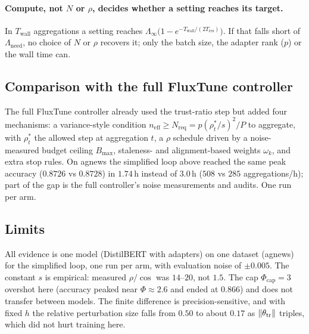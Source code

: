 \paragraph{Compute, not $N$ or $\rho$, decides whether a setting reaches its target.}
In $T_{\mathrm{wall}}$ aggregations a setting reaches $\Lambda_\infty\bigl(1-e^{-T_{\mathrm{wall}}/(2T_{\mathrm{res}})}\bigr)$. If that falls short of $\Lambda_{\mathrm{need}}$, no choice of $N$ or $\rho$ recovers it;
only the batch size, the adapter rank ($p$) or the wall time can.

\subsection{Comparison with the full FluxTune controller}
\label{sec:ft:full}
The full FluxTune controller already used the trust-ratio step but added four mechanisms: a variance-style condition $n_{\mathrm{eff}}\ge N_{\mathrm{req}}=p(\rho^*_t/s)^2/P$ to aggregate, with $\rho^*_t$ the allowed step at aggregation $t$,
a $\rho$ schedule driven by a noise-measured budget ceiling $B_{\max}$, staleness- and alignment-based weights $\omega_k$, and extra stop rules. On agnews the simplified loop above reached the same peak accuracy
($0.8726$ vs $0.8728$) in $1.74$\,h instead of $3.0$\,h ($508$ vs $285$ aggregations/h); part of the gap is the full controller's noise measurements and audits. One run per arm.

\subsection{Limits}
\label{sec:ft:discussion}
All evidence is one model (DistilBERT with adapters) on one dataset (agnews) for the simplified loop, one run per arm, with evaluation noise of $\pm0.005$. The constant $s$ is empirical:
measured $\rho/\cos$ was $14$--$20$, not $1.5$. The cap $\Phi_{\mathrm{cap}}=3$ overshot here (accuracy peaked near $\Phi\approx2.6$ and ended at $0.866$) and does not transfer between models.
The finite difference is precision-sensitive, and with fixed $h$ the relative perturbation size falls from $0.50$ to about $0.17$ as $\lVert \theta_{\mathrm{tr}}\rVert$ triples, which did not hurt training here.

